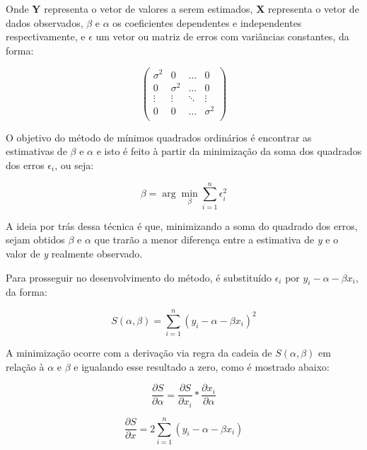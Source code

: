 Onde \textbf{Y} representa o vetor de valores a serem estimados, \textbf{X} representa o vetor de dados observados, $\beta$ e $\alpha$ os coeficientes dependentes e independentes respectivamente, e $\epsilon$ um vetor ou matriz de erros com variâncias constantes, da forma:

\begin{equation*} \left(\begin{array}{cccc} \sigma^{2} & 0 & \ldots & 0 \\ 0 & \sigma^{2} & \ldots & 0 \\ \vdots & \vdots & \ddots & \vdots \\ 0 & 0 & \ldots & \sigma^{2} \\ \end{array} \right) \end{equation*}

O objetivo do método de mínimos quadrados ordinários é encontrar as estimativas de $\beta$ e $\alpha$ e isto é feito à partir da minimização da soma dos quadrados dos erros $\epsilon_i$, ou seja:

\begin{equation}\label{eq:2}
\beta =\arg\min_{\beta}\sum_{i=1}^{n}\epsilon_{i}^{2} 
\end{equation}

A ideia por trás dessa técnica é que, minimizando a soma do quadrado dos erros, sejam obtidos $\beta$ e $\alpha$ que trarão a menor diferença entre a estimativa de \textit{y}  e o valor de \textit{y} realmente observado. 

Para prosseguir no desenvolvimento do método, é substituído $\epsilon_i$ por $y_i - \alpha - \beta x_i$, da forma:

\begin{equation}\label{eq:3}
S(\alpha, \beta) = \sum_{i=1}^{n} (y_i - \alpha - \beta x_i)^2
\end{equation}

A minimização ocorre com a derivação via regra da cadeia de $S(\alpha, \beta)$ em relação à $\alpha$ e $\beta$ e igualando esse resultado a zero, como é mostrado abaixo:

\begin{equation*} 
\frac{\partial S}{\partial \alpha} = \frac{\partial S}{\partial x_i} \ast \frac{\partial x_i}{\partial \alpha}
\end{equation*}

\begin{equation*}
\frac{\partial S}{\partial x} = 2 \sum_{i=1}^{n} (y_i - \alpha - \beta x_i)
\end{equation*}

